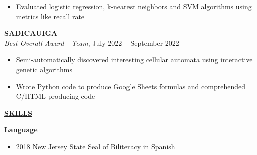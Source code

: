 \documentclass[
]{article}
\providecommand{\tightlist}{%
  \setlength{\itemsep}{0pt}\setlength{\parskip}{0pt}}
\begin{document}
\begin{itemize}
\tightlist
\item
Evaluated logistic regression, k-nearest neighbors and SVM algorithms using metrics like recall rate  
\end{itemize}

\textbf{SADICAUIGA} \\
\emph{Best Overall Award - Team}, July 2022 -- September 2022 %
\begin{itemize}
\tightlist
\item
Semi-automatically discovered interesting cellular automata using interactive genetic algorithms
\end{itemize}

\begin{itemize}
\tightlist
\item
Wrote Python code to produce Google Sheets formulas and comprehended C/HTML-producing code
\end{itemize}











\textbf{\underline{SKILLS}}

\textbf{Language}

\begin{itemize}
\item
  2018 New Jersey State Seal of Biliteracy in Spanish
\end{itemize}
\end{document}
